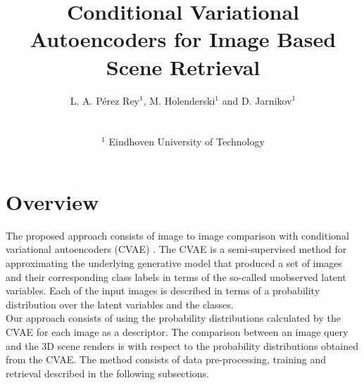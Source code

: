 

\title[]%
      {Conditional Variational Autoencoders for Image Based Scene Retrieval}

\author[L.A. Pérez Rey \& M. Holenderski \& Dmitri Jarnikov]
{\parbox{\textwidth}{\centering L. A. P\'{e}rez Rey$^{1}$, M. Holenderski$^{1}$
        and D. Jarnikov$^{1}$ 
        }
        \\
{\parbox{\textwidth}{\centering $^1$ Eindhoven University of Technology
       }
}
}

%



\maketitle
\section{Overview}

The proposed approach consists of image to image comparison with conditional variational autoencoders (CVAE) \cite{Kingma2014a}. The CVAE is a semi-supervised method for approximating the underlying generative model that produced a set of images and their corresponding class labels in terms of the so-called unobserved latent variables. Each of the input images is described in terms of a probability distribution over the latent variables and the classes.  \\

Our approach consists of using the probability distributions calculated by the CVAE for each image as a descriptor. The comparison between an image query and the 3D scene renders is with respect to the probability distributions obtained from the CVAE. The method consists of data pre-processing, training and retrieval described in the following subsections.

